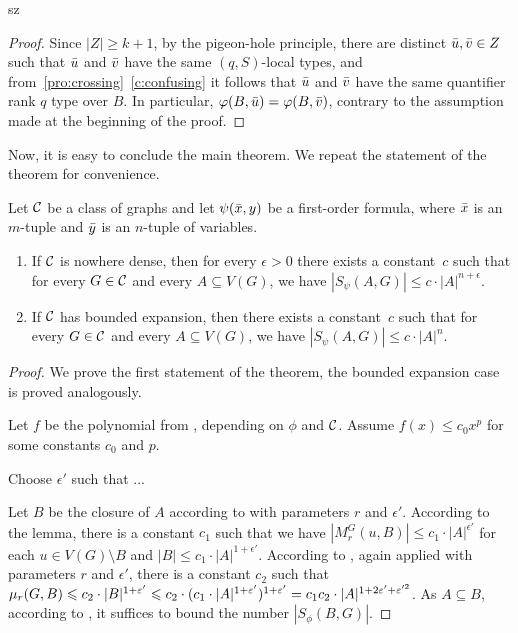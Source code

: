 \begin{change}{sz}
\begin{proof}
Since $|Z|\geq k+1$, by the pigeon-hole principle, there are  distinct $\bar{u},\bar{v}\in Z$ such that 
$\bar{u}$ and $\bar{v}$ have the same $(q,S)$-local types,
and from~\cref{pro:crossing}~\cref{c:confusing} it follows that $\bar{u}$ and $\bar{v}$
have the same quantifier rank $q$ type over $B$.
In particular, $\varphi(B,\bar{u})=\varphi(B,\bar{v})$, contrary to the assumption made at the beginning of the proof.
\end{proof}


Now, it is easy to conclude the main theorem. We repeat the statement of the theorem 
for convenience.

\setcounter{theorem}{2}
\begin{theorem}
Let $\mathcal{C}$ be a class of graphs and let $\psi(\bar{x},y)$ be a first-order formula, where 
$\bar{x}$ is an $m$-tuple and $\bar{y}$ is an $n$-tuple of variables. 
\begin{enumerate}
\item If $\mathcal{C}$ is nowhere dense, then for every $\epsilon>0$ 
there exists a constant~$c$ such that for every $G\in \mathcal{C}$ and every
$A\subseteq V(G)$, we have $|S_\psi(A,G)|\leq c\cdot |A|^{n+\epsilon}.$

\item If $\mathcal{C}$ has bounded expansion, then there exists a constant~$c$ such that for every $G\in \mathcal{C}$ and every $A\subseteq V(G)$, we have $|S_\psi(A,G)|\leq c\cdot |A|^n$.
\end{enumerate}
\end{theorem}
\begin{proof}
We prove the first statement of the theorem, the bounded
expansion case is proved analogously. 

Let $f$ be the polynomial from ,
depending on $\phi$ and $\mathcal{C}$. Assume $f(x)\leq c_0x^p$ 
for some constants $c_0$ and $p$. 

Choose $\epsilon'$ such that ...

Let $B$ be the closure of $A$ according to  with 
parameters $r$ and $\epsilon'$. According to the lemma, 
there is a constant $c_1$ such that 
we have $|M_r^G(u,B)|\leq c_1\cdot |A|^{\epsilon'}$ 
for each $u\in V(G)\setminus B$ and 
$|B|\leq c_1\cdot |A|^{1+\epsilon'}$. According to 
, again applied
with parameters $r$ and $\epsilon'$, 
there is a constant
$c_2$ such that 
$\mu_r(G,B)\leqslant c_2\cdot |B|^{1+\varepsilon'}\leqslant
c_2\cdot (c_1\cdot |A|^{1+\varepsilon'})^{1+\varepsilon'}=c_1c_2\cdot|A|^{1+2\varepsilon'+\varepsilon'^2}$.
As $A\subseteq B$, 
according to , it suffices to bound the
number $|S_\phi(B,G)|$. 


\end{proof}
\end{change}
